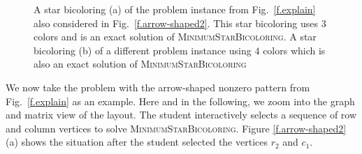 \documentclass[12pt, oneside]{book}
\newcommand{\MinStaBic}{\textsc{MinimumStarBicoloring}}
\begin{document}
\begin{figure}
\centering
{}%
  \hfill
{}%
\caption{A star bicoloring (a) of the problem instance from
Fig.~\protect\ref{f.explain} also considered in Fig.~\protect\ref{f.arrow-shaped2}. This
star bicoloring uses $3$ colors and is an exact solution of \MinStaBic. A star bicoloring
(b) of a different problem instance using $4$ colors which is also an exact
solution of \MinStaBic} \label{f.arrow-shaped4}
\end{figure}

We now take the problem with the arrow-shaped nonzero pattern from Fig.~\ref{f.explain}
as an example. Here and in the following, we zoom into the graph and matrix view of the
layout. The student interactively selects a sequence of row and column vertices to solve
\MinStaBic. Figure \ref{f.arrow-shaped2} (a) shows the situation after the student
selected the vertices $r_2$ and $c_1$.
\end{document}
